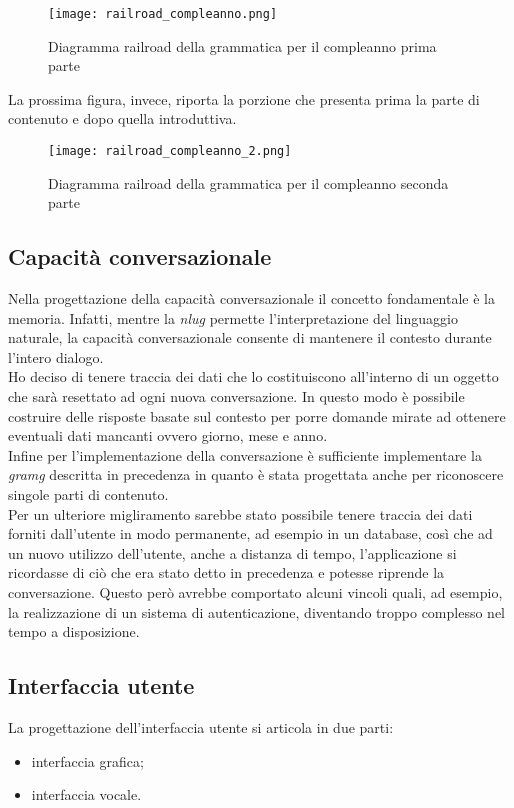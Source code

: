 	\begin{figure}[htbp]
		\begin{center}
			\texttt{[image: railroad\_compleanno.png]}
			\caption{Diagramma railroad della grammatica per il compleanno prima parte}
		\end{center}
	\end{figure}
	\pagebreak

	La prossima figura, invece, riporta la porzione che presenta prima la parte di contenuto e dopo quella introduttiva.
	\begin{figure}[htbp]
		\begin{center}
			\texttt{[image: railroad\_compleanno\_2.png]}
			\caption{Diagramma railroad della grammatica per il compleanno seconda parte}
		\end{center}
	\end{figure}
	\pagebreak

	\subsection{Capacità conversazionale}
	Nella progettazione della capacità conversazionale il concetto fondamentale è la memoria. Infatti, mentre la \emph{\gls{nlug}} permette l'interpretazione del linguaggio naturale, la capacità conversazionale consente di mantenere il contesto durante l'intero dialogo. \\
	Ho deciso di tenere traccia dei dati che lo costituiscono all'interno di un oggetto che sarà resettato ad ogni nuova conversazione. In questo modo è possibile costruire delle risposte basate sul contesto per porre domande mirate ad ottenere eventuali dati mancanti ovvero giorno, mese e anno. \\
	Infine per l'implementazione della conversazione è sufficiente implementare la \emph{\gls{gramg}} descritta in precedenza in quanto è stata progettata anche per riconoscere singole parti di contenuto. \\
	Per un ulteriore migliramento sarebbe stato possibile tenere traccia dei dati forniti dall'utente in modo permanente, ad esempio in un database, così che ad un nuovo utilizzo dell'utente, anche a distanza di tempo, l'applicazione si ricordasse di ciò che era stato detto in precedenza e potesse riprende la conversazione. Questo però avrebbe comportato alcuni vincoli quali, ad esempio, la realizzazione di un sistema di autenticazione, diventando troppo complesso nel tempo a disposizione. 
	\subsection{Interfaccia utente}
	La progettazione dell'interfaccia utente si articola in due parti:
	\begin{itemize}
		\item interfaccia grafica;
		\item interfaccia vocale.
	\end{itemize}
